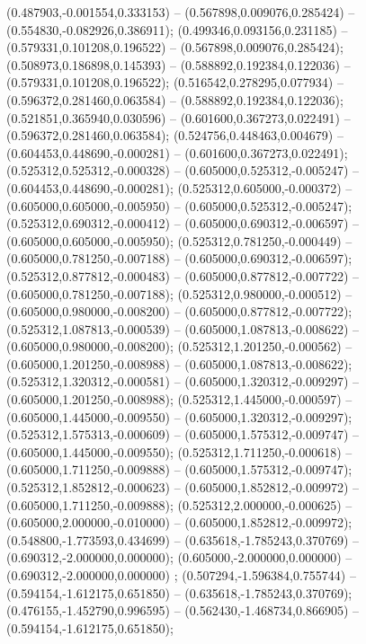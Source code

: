  (0.487903,-0.001554,0.333153) -- (0.567898,0.009076,0.285424) -- (0.554830,-0.082926,0.386911);
 (0.499346,0.093156,0.231185) -- (0.579331,0.101208,0.196522) -- (0.567898,0.009076,0.285424);
 (0.508973,0.186898,0.145393) -- (0.588892,0.192384,0.122036) -- (0.579331,0.101208,0.196522);
 (0.516542,0.278295,0.077934) -- (0.596372,0.281460,0.063584) -- (0.588892,0.192384,0.122036);
 (0.521851,0.365940,0.030596) -- (0.601600,0.367273,0.022491) -- (0.596372,0.281460,0.063584);
 (0.524756,0.448463,0.004679) -- (0.604453,0.448690,-0.000281) -- (0.601600,0.367273,0.022491);
 (0.525312,0.525312,-0.000328) -- (0.605000,0.525312,-0.005247) -- (0.604453,0.448690,-0.000281);
 (0.525312,0.605000,-0.000372) -- (0.605000,0.605000,-0.005950) -- (0.605000,0.525312,-0.005247);
 (0.525312,0.690312,-0.000412) -- (0.605000,0.690312,-0.006597) -- (0.605000,0.605000,-0.005950);
 (0.525312,0.781250,-0.000449) -- (0.605000,0.781250,-0.007188) -- (0.605000,0.690312,-0.006597);
 (0.525312,0.877812,-0.000483) -- (0.605000,0.877812,-0.007722) -- (0.605000,0.781250,-0.007188);
 (0.525312,0.980000,-0.000512) -- (0.605000,0.980000,-0.008200) -- (0.605000,0.877812,-0.007722);
 (0.525312,1.087813,-0.000539) -- (0.605000,1.087813,-0.008622) -- (0.605000,0.980000,-0.008200);
 (0.525312,1.201250,-0.000562) -- (0.605000,1.201250,-0.008988) -- (0.605000,1.087813,-0.008622);
 (0.525312,1.320312,-0.000581) -- (0.605000,1.320312,-0.009297) -- (0.605000,1.201250,-0.008988);
 (0.525312,1.445000,-0.000597) -- (0.605000,1.445000,-0.009550) -- (0.605000,1.320312,-0.009297);
 (0.525312,1.575313,-0.000609) -- (0.605000,1.575312,-0.009747) -- (0.605000,1.445000,-0.009550);
 (0.525312,1.711250,-0.000618) -- (0.605000,1.711250,-0.009888) -- (0.605000,1.575312,-0.009747);
 (0.525312,1.852812,-0.000623) -- (0.605000,1.852812,-0.009972) -- (0.605000,1.711250,-0.009888);
 (0.525312,2.000000,-0.000625) -- (0.605000,2.000000,-0.010000) -- (0.605000,1.852812,-0.009972);
 (0.548800,-1.773593,0.434699) -- (0.635618,-1.785243,0.370769) -- (0.690312,-2.000000,0.000000);
 (0.605000,-2.000000,0.000000) -- (0.690312,-2.000000,0.000000) ;
 (0.507294,-1.596384,0.755744) -- (0.594154,-1.612175,0.651850) -- (0.635618,-1.785243,0.370769);
 (0.476155,-1.452790,0.996595) -- (0.562430,-1.468734,0.866905) -- (0.594154,-1.612175,0.651850);
